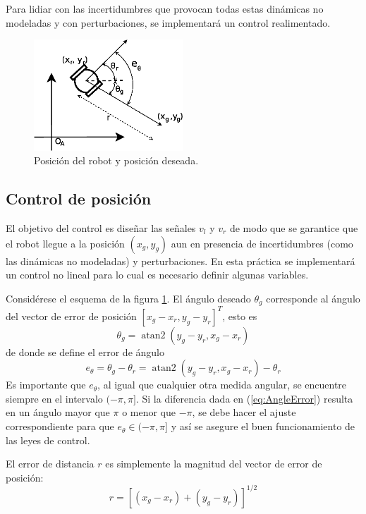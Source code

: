 \documentclass[letterpaper,12pt]{article}
\DeclareMathOperator{\atantwo}{atan2}
\begin{document}
Para lidiar con las incertidumbres que provocan todas estas dinámicas no modeladas y con perturbaciones, se implementará un control realimentado.
\begin{figure}
\centering
\includegraphics[width=0.5\textwidth]{Figures/GoalPose.eps}
\caption{Posición del robot y posición deseada.}
\label{fig:Coords}
\end{figure}

\subsection{Control de posición}
El objetivo del control es diseñar las señales $v_l$ y $v_r$ de modo que se garantice que el robot llegue a la posición $\left(x_g, y_g\right)$ aun en presencia de incertidumbres (como las dinámicas no modeladas) y perturbaciones. En esta práctica se implementará un control no lineal para lo cual es necesario definir algunas variables.

Considérese el esquema de la figura \ref{fig:Coords}. El ángulo deseado $\theta_g$ corresponde al ángulo del vector de error de posición $\left[x_g - x_r, y_g - y_r\right]^T$, esto es
\[\theta_g = \atantwo\left(y_g - y_r, x_g - x_r\right)\]
de donde se define el error de ángulo
\begin{equation}
  e_{\theta} = \theta_g - \theta_r = \atantwo\left(y_g - y_r, x_g - x_r\right) - \theta_r \label{eq:AngleError}
\end{equation}
Es importante que $e_{\theta}$, al igual que cualquier otra medida angular, se encuentre siempre en el intervalo $(-\pi, \pi]$. Si la diferencia dada en (\ref{eq:AngleError}) resulta en un ángulo mayor que $\pi$  o menor que $-\pi$, se debe hacer el ajuste correspondiente para que $e_{\theta} \in (-\pi, \pi]$  y así se asegure el buen funcionamiento de las leyes de control.

El error de distancia $r$ es simplemente la magnitud del vector de error de posición:
\[r= \left[\left(x_g - x_r\right) + \left(y_g - y_r\right)\right]^{1/2}\]
\end{document}
